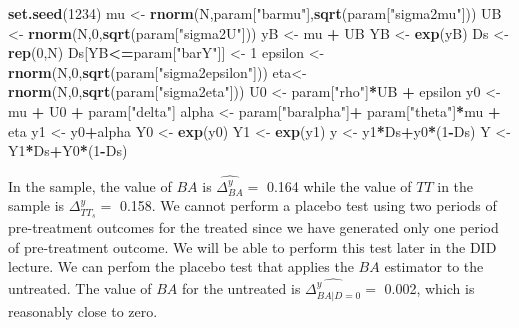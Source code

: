 \documentclass[]{book}
\newenvironment{Shaded}{\begin{snugshade}}{\end{snugshade}}
\newcommand{\KeywordTok}[1]{\textcolor[rgb]{0.13,0.29,0.53}{\textbf{#1}}}
\newcommand{\DecValTok}[1]{\textcolor[rgb]{0.00,0.00,0.81}{#1}}
\newcommand{\StringTok}[1]{\textcolor[rgb]{0.31,0.60,0.02}{#1}}
\newcommand{\OperatorTok}[1]{\textcolor[rgb]{0.81,0.36,0.00}{\textbf{#1}}}
\newcommand{\NormalTok}[1]{#1}
\theoremstyle{definition}
\theoremstyle{definition}
\theoremstyle{definition}
\theoremstyle{remark}
\begin{document}
\begin{Shaded}
\begin{Highlighting}[]
\KeywordTok{set.seed}\NormalTok{(}\DecValTok{1234}\NormalTok{)}
\NormalTok{mu <-}\StringTok{ }\KeywordTok{rnorm}\NormalTok{(N,param[}\StringTok{"barmu"}\NormalTok{],}\KeywordTok{sqrt}\NormalTok{(param[}\StringTok{"sigma2mu"}\NormalTok{]))}
\NormalTok{UB <-}\StringTok{ }\KeywordTok{rnorm}\NormalTok{(N,}\DecValTok{0}\NormalTok{,}\KeywordTok{sqrt}\NormalTok{(param[}\StringTok{"sigma2U"}\NormalTok{]))}
\NormalTok{yB <-}\StringTok{ }\NormalTok{mu }\OperatorTok{+}\StringTok{ }\NormalTok{UB }
\NormalTok{YB <-}\StringTok{ }\KeywordTok{exp}\NormalTok{(yB)}
\NormalTok{Ds <-}\StringTok{ }\KeywordTok{rep}\NormalTok{(}\DecValTok{0}\NormalTok{,N)}
\NormalTok{Ds[YB}\OperatorTok{<=}\NormalTok{param[}\StringTok{"barY"}\NormalTok{]] <-}\StringTok{ }\DecValTok{1} 
\NormalTok{epsilon <-}\StringTok{ }\KeywordTok{rnorm}\NormalTok{(N,}\DecValTok{0}\NormalTok{,}\KeywordTok{sqrt}\NormalTok{(param[}\StringTok{"sigma2epsilon"}\NormalTok{]))}
\NormalTok{eta<-}\StringTok{ }\KeywordTok{rnorm}\NormalTok{(N,}\DecValTok{0}\NormalTok{,}\KeywordTok{sqrt}\NormalTok{(param[}\StringTok{"sigma2eta"}\NormalTok{]))}
\NormalTok{U0 <-}\StringTok{ }\NormalTok{param[}\StringTok{"rho"}\NormalTok{]}\OperatorTok{*}\NormalTok{UB }\OperatorTok{+}\StringTok{ }\NormalTok{epsilon}
\NormalTok{y0 <-}\StringTok{ }\NormalTok{mu }\OperatorTok{+}\StringTok{  }\NormalTok{U0 }\OperatorTok{+}\StringTok{ }\NormalTok{param[}\StringTok{"delta"}\NormalTok{]}
\NormalTok{alpha <-}\StringTok{ }\NormalTok{param[}\StringTok{"baralpha"}\NormalTok{]}\OperatorTok{+}\StringTok{  }\NormalTok{param[}\StringTok{"theta"}\NormalTok{]}\OperatorTok{*}\NormalTok{mu }\OperatorTok{+}\StringTok{ }\NormalTok{eta}
\NormalTok{y1 <-}\StringTok{ }\NormalTok{y0}\OperatorTok{+}\NormalTok{alpha}
\NormalTok{Y0 <-}\StringTok{ }\KeywordTok{exp}\NormalTok{(y0)}
\NormalTok{Y1 <-}\StringTok{ }\KeywordTok{exp}\NormalTok{(y1)}
\NormalTok{y <-}\StringTok{ }\NormalTok{y1}\OperatorTok{*}\NormalTok{Ds}\OperatorTok{+}\NormalTok{y0}\OperatorTok{*}\NormalTok{(}\DecValTok{1}\OperatorTok{-}\NormalTok{Ds)}
\NormalTok{Y <-}\StringTok{ }\NormalTok{Y1}\OperatorTok{*}\NormalTok{Ds}\OperatorTok{+}\NormalTok{Y0}\OperatorTok{*}\NormalTok{(}\DecValTok{1}\OperatorTok{-}\NormalTok{Ds)}
\end{Highlighting}
\end{Shaded}

In the sample, the value of \(BA\) is \(\hat{\Delta^y_{BA}}=\) 0.164
while the value of \(TT\) in the sample is \(\Delta^y_{TT_s}=\) 0.158.
We cannot perform a placebo test using two periods of pre-treatment
outcomes for the treated since we have generated only one period of
pre-treatment outcome. We will be able to perform this test later in the
DID lecture. We can perfom the placebo test that applies the \(BA\)
estimator to the untreated. The value of \(BA\) for the untreated is
\(\hat{\Delta^y_{BA|D=0}}=\) 0.002, which is reasonably close to zero.
\end{document}
